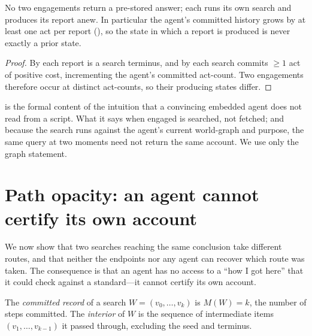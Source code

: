 \documentclass[11pt,twocolumn,a4paper]{article}
\newcommand{\Walk}{W}
\newcommand{\rec}{M}
\begin{document}
\begin{corollary}
\label{cor:fresh}
No two engagements return a pre-stored answer; each runs its own search and
produces its report anew. In particular the agent's committed history grows
by at least one act per report (), so the state in which a
report is produced is never exactly a prior state.
\end{corollary}

\begin{proof}
By  each report is a search terminus, and by
 each search commits $\ge1$ act of positive cost,
incrementing the agent's committed act-count. Two engagements therefore
occur at distinct act-counts, so their producing states differ.
\end{proof}

\begin{remark}
\label{rem:nocanned}
 is the formal content of the intuition that a
convincing embedded agent does not read from a script. What it says when
engaged is searched, not fetched; and because the search runs against the
agent's current world-graph and purpose, the same query at two moments need
not return the same account. We use only the graph statement.
\end{remark}

\section{Path opacity: an agent cannot certify its own account}
\label{sec:opacity}

We now show that two searches reaching the same conclusion take different
routes, and that neither the endpoints nor any agent can recover which route
was taken. The consequence is that an agent has no access to a
``how I got here'' that it could check against a standard---it cannot
certify its own account.

\begin{definition}
\label{def:record}
The \emph{committed record} of a search $\Walk=(v_0,\dots,v_k)$ is
$\rec(\Walk)=k$, the number of steps committed. The \emph{interior} of
$\Walk$ is the sequence of intermediate items $(v_1,\dots,v_{k-1})$ it
passed through, excluding the seed and terminus.
\end{definition}
\end{document}
